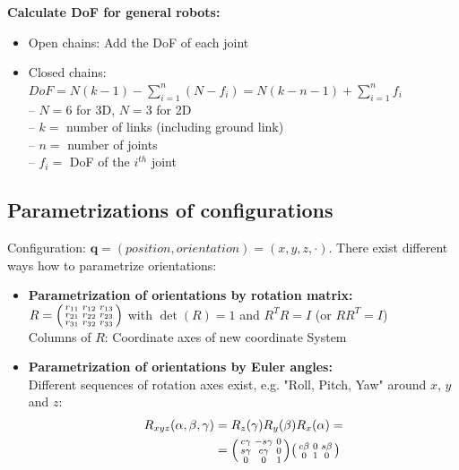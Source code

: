 \begin{multicols*}{2}
\textbf{Calculate DoF for general robots:}
\begin{itemize}
	\item Open chains: Add the DoF of each joint
	\item Closed chains:\\
	$DoF = N(k-1) - \sum_{i=1}^{n} (N-f_i) = N(k-n-1) + \sum_{i=1}^{n} f_i$ \\
	– $N=6$ for 3D, $N=3$ for 2D\\
	– $k =$ number of links (including ground link)\\
	– $n =$ number of joints\\
	– $f_i =$ DoF of the $i^{th}$ joint
\end{itemize}

\subsection{Parametrizations of configurations}
Configuration: $\mathbold{q}=(position, orientation)=(x,y,z,\cdot)$.
There exist different ways how to parametrize orientations:
\begin{itemize}
	\item \textbf{Parametrization of orientations by rotation matrix:}\\
		$R=
		\begin{psmallmatrix}
			r_{11} & r_{12} & r_{13}\\
			r_{21} & r_{22} & r_{23}\\
			r_{31} & r_{32} & r_{33}
		\end{psmallmatrix}$
		with $\det(R)=1$ and $R^T R=I$ (or $R R^T=I$) \\
		Columns of $R$: Coordinate axes of new coordinate System
	\item \textbf{Parametrization of orientations by Euler angles:}\\
	Different sequences of rotation axes exist, e.g. "Roll, Pitch, Yaw" around $x$, $y$ and $z$:
	\begin{align*}
		R_{xyz}(\alpha, \beta, \gamma) &= R_z(\gamma)R_y(\beta)R_x(\alpha)=\\
		&=
		\begin{psmallmatrix}
			c\gamma & -s\gamma & 0\\
			s\gamma & c\gamma & 0\\
			0 & 0 & 1
		\end{psmallmatrix}
		\begin{psmallmatrix}
			c\beta & 0 & s\beta\\
			0 & 1 & 0\\

\end{psmallmatrix}
\end{align*}
\end{itemize}
\end{multicols*}
